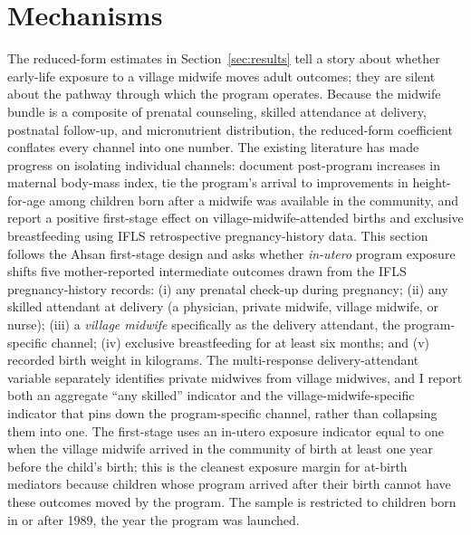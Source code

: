 
\section{Mechanisms} \label{sec:mechanisms}

The reduced-form estimates in Section~\ref{sec:results} tell a story about whether early-life exposure to a village midwife moves adult outcomes; they are silent about the pathway through which the program operates. Because the midwife bundle is a composite of prenatal counseling, skilled attendance at delivery, postnatal follow-up, and micronutrient distribution, the reduced-form coefficient conflates every channel into one number. The existing literature has made progress on isolating individual channels: \textcite{frankenbergthomas2001} document post-program increases in maternal body-mass index, \textcite{frankenberg2005} tie the program's arrival to improvements in height-for-age among children born after a midwife was available in the community, and \textcite{ahsan2021} report a positive first-stage effect on village-midwife-attended births and exclusive breastfeeding using IFLS retrospective pregnancy-history data. This section follows the Ahsan first-stage design and asks whether \emph{in-utero} program exposure shifts five mother-reported intermediate outcomes drawn from the IFLS pregnancy-history records: (i) any prenatal check-up during pregnancy; (ii) any skilled attendant at delivery (a physician, private midwife, village midwife, or nurse); (iii) a \emph{village midwife} specifically as the delivery attendant, the program-specific channel; (iv) exclusive breastfeeding for at least six months; and (v) recorded birth weight in kilograms. The multi-response delivery-attendant variable separately identifies private midwives from village midwives, and I report both an aggregate ``any skilled'' indicator and the village-midwife-specific indicator that pins down the program-specific channel, rather than collapsing them into one. The first-stage uses an in-utero exposure indicator equal to one when the village midwife arrived in the community of birth at least one year before the child's birth; this is the cleanest exposure margin for at-birth mediators because children whose program arrived after their birth cannot have these outcomes moved by the program. The sample is restricted to children born in or after 1989, the year the program was launched.

